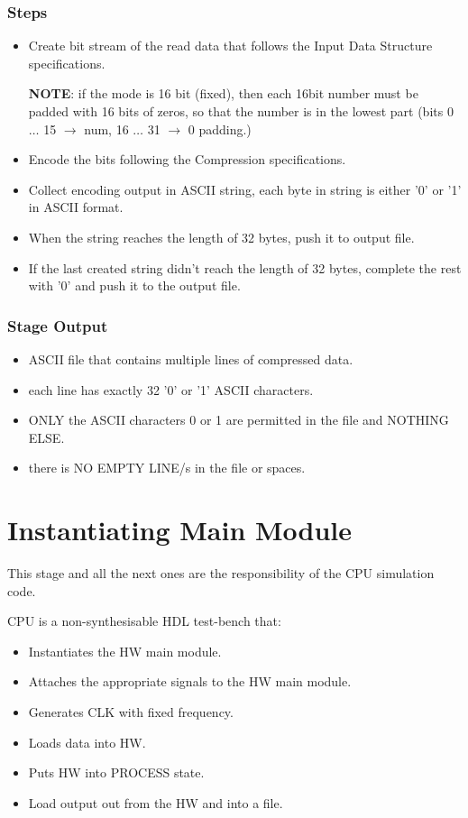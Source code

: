 \documentclass[12pt]{report}
\begin{document}
\subsubsection{Steps}
\begin{itemize}
    \item Create bit stream of the read data that follows the {Input Data Structure} specifications.

        \textbf{NOTE}:  if the mode is 16 bit (fixed), then each 16bit number must be padded with 16 bits of zeros, so that the number is in the lowest part (bits 0 $\dots$ 15 $\rightarrow$ num, 16 $\dots$ 31 $\rightarrow$ 0 padding.)
    \item Encode the bits following the {Compression} specifications.
    \item Collect encoding output in ASCII string, each byte in string is either '0' or '1' in ASCII format.
    \item When the string reaches the length of 32 bytes, push it to output file.
    \item If the last created string didn't reach the length of 32 bytes, complete the rest with '0' and push it to the output file.    
\end{itemize}

\subsubsection{Stage Output}
\begin{itemize}
    \item ASCII file that contains multiple lines of compressed data.
    \item each line has exactly 32 '0' or '1' ASCII characters.
    \item ONLY the ASCII characters 0 or 1 are permitted in the file and NOTHING ELSE.
    \item there is NO EMPTY LINE/s in the file or spaces.
\end{itemize}

\section{Instantiating Main Module}
This stage and all the next ones are the responsibility of the CPU simulation code.

CPU is a non-synthesisable HDL test-bench that:
\begin{itemize}
    \item Instantiates the HW main module.
    \item Attaches the appropriate signals to the HW main module.
    \item Generates CLK with fixed frequency.
    \item Loads data into HW.
    \item Puts HW into PROCESS state.
    \item Load output out from the HW and into a file.
\end{itemize}
\end{document}
